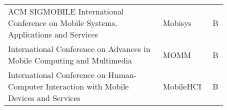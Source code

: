 \documentclass{scrartcl}
\begin{document}
\begin{table}[t]
\begin{tabular}{C{0.65\linewidth}C{0.17\linewidth}C{0.05\linewidth}}
ACM SIGMOBILE International Conference on Mobile Systems, Applications and Services                    & Mobisys                              & B                                 \\
\cmidrule(l){1-3}



International Conference on Advances in Mobile Computing and Multimedia                                & MOMM                                 & B                                 \\
\cmidrule(l){1-3}

International Conference on Human-Computer Interaction with Mobile Devices and Services                & MobileHCI                            & B                                 \\
\cmidrule(l){1-3}







\end{tabular}
\end{table}
\end{document}
